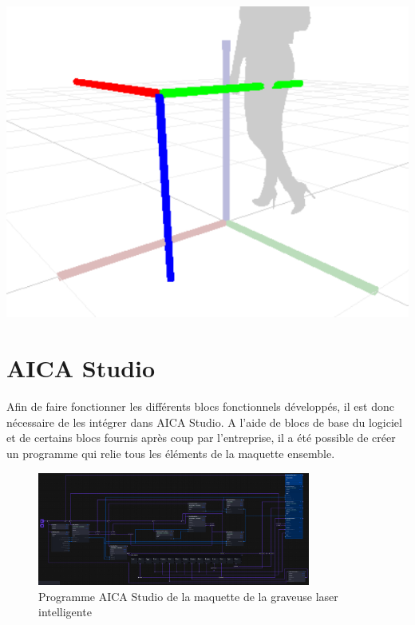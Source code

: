 \begin{minipage}{0.4\textwidth}
    \centering
    \includegraphics[width=0.95\linewidth]{assets/figures/Transform_example.png}
\end{minipage}

\section{AICA Studio}
Afin de faire fonctionner les différents blocs fonctionnels développés, il est donc nécessaire de les intégrer dans AICA Studio. A l'aide de blocs de base du logiciel et de certains blocs fournis après coup par l'entreprise, il a été possible de créer un programme qui relie tous les éléments de la maquette ensemble.
\begin{figure}[H]
    \centering
    \includegraphics[width=0.8\textwidth]{assets/figures/AICA_Prog_All.png}
    \caption{Programme AICA Studio de la maquette de la graveuse laser intelligente}
    \label{fig:aica_programme}
\end{figure}


